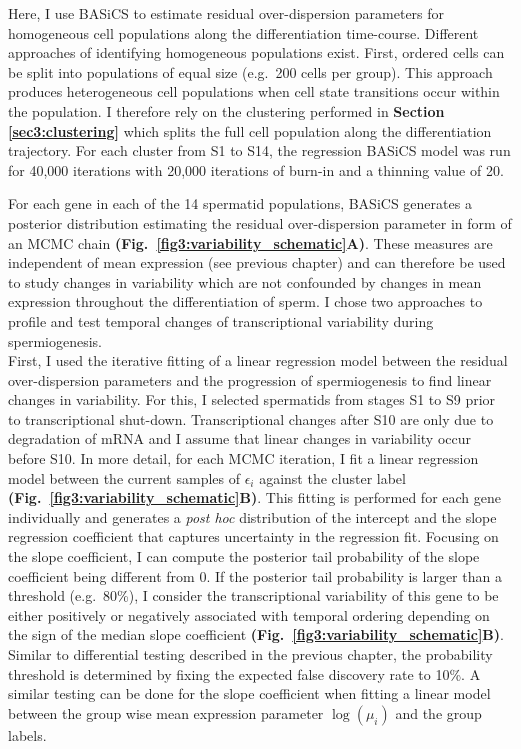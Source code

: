 Here, I use BASiCS to estimate residual over-dispersion parameters for homogeneous cell populations along the differentiation time-course. Different approaches of identifying homogeneous populations exist. First, ordered cells can be split into populations of equal size (e.g.~200 cells per group). This approach produces heterogeneous cell populations when cell state transitions occur within the population. I therefore rely on the clustering performed in \textbf{Section \ref{sec3:clustering}} which splits the full cell population along the differentiation trajectory. For each cluster from S1 to S14, the regression BASiCS model was run for 40,000 iterations with 20,000 iterations of burn-in and a thinning value of 20. 

\newpage

For each gene in each of the 14 spermatid populations, BASiCS generates a posterior distribution estimating the residual over-dispersion parameter in form of an MCMC chain \textbf{(Fig.~\ref{fig3:variability_schematic}A)}. These measures are independent of mean expression (see previous chapter) and can therefore be used to study changes in variability which are not confounded by changes in mean expression throughout the differentiation of sperm. I chose two approaches to profile and test temporal changes of transcriptional variability during spermiogenesis. \\

First, I used the iterative fitting of a linear regression model between the residual over-dispersion parameters and the progression of spermiogenesis to find linear changes in variability. For this, I selected spermatids from stages S1 to S9 prior to transcriptional shut-down. Transcriptional changes after S10 are only due to degradation of mRNA and I assume that linear changes in variability occur before S10. In more detail, for each MCMC iteration, I fit a linear regression model between the current samples of $\epsilon_i$ against the cluster label \textbf{(Fig.~\ref{fig3:variability_schematic}B)}. This fitting is performed for each gene individually and generates a \emph{post hoc} distribution of the intercept and the slope regression coefficient that captures uncertainty in the regression fit. Focusing on the slope coefficient, I can compute the posterior tail probability of the slope coefficient being different from 0. If the posterior tail probability is larger than a threshold (e.g.~80\%), I consider the transcriptional variability of this gene to be either positively or negatively associated with temporal ordering depending on the sign of the median slope coefficient \textbf{(Fig.~\ref{fig3:variability_schematic}B)}. Similar to differential testing described in the previous chapter, the probability threshold is determined by fixing the expected false discovery rate to 10\%. A similar testing can be done for the slope coefficient when fitting a linear model between the group wise mean expression parameter $\log(\mu_i)$ and the group labels.\\

